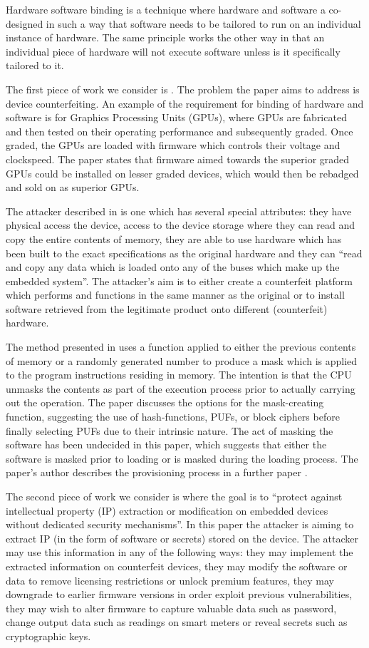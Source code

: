 Hardware software binding is a technique where hardware and software a co-designed in such a way that software needs to be tailored to run on an individual instance of hardware. The same principle works the other way in that an individual piece of hardware will not execute software unless is it specifically tailored to it.

The first piece of work we consider is \cite{Lee2016}. The problem the paper aims to address is device counterfeiting. An example of the requirement for binding of hardware and software is for Graphics Processing Units (GPUs), where GPUs are fabricated and then tested on their operating performance and subsequently graded. Once graded, the GPUs are loaded with firmware which controls their voltage and clockspeed. The paper states that firmware aimed towards the superior graded GPUs could be installed on lesser graded devices, which would then be rebadged and sold on as superior GPUs.

The attacker described in \cite{Lee2016} is one which has several special attributes: they have physical access the device, access to the device storage where they can read and copy the entire contents of memory, they are able to use hardware which has been built to the exact specifications as the original hardware and they can ``read and copy any data which is loaded onto any of the buses which make up the embedded system''. The attacker's aim is to either create a counterfeit platform which performs and functions in the same manner as the original or to install software retrieved from the legitimate product onto different (counterfeit) hardware.

The method presented in \cite{Lee2016} uses a function applied to either the previous contents of memory or a randomly generated number to produce a mask which is applied to the program instructions residing in memory. The intention is that the CPU unmasks the contents as part of the execution process prior to actually carrying out the operation. The paper discusses the options for the mask-creating function, suggesting the use of hash-functions, PUFs, or block ciphers before finally selecting PUFs due to their intrinsic nature. The act of masking the software has been undecided in this paper, which suggests that either the software is masked prior to loading or is masked during the loading process. The paper's author describes the provisioning process in a further paper \cite{Lee2017}.

The second piece of work we consider is \cite{Schaller2014} where the goal is to ``protect against intellectual property (IP) extraction or modification on embedded devices without dedicated security mechanisms''. In this paper the attacker is aiming to extract IP (in the form of software or secrets) stored on the device. The attacker may use this information in any of the following ways: they may implement the extracted information on counterfeit devices, they may modify the software or data to remove licensing restrictions or unlock premium features, they may downgrade to earlier firmware versions  in order exploit previous vulnerabilities, they may wish to alter firmware to capture valuable data such as password, change output data such as readings on smart meters or reveal secrets such as cryptographic keys.

